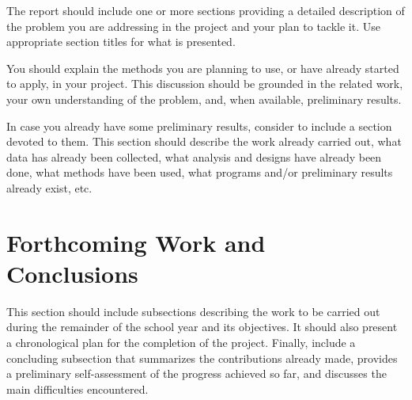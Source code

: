 \documentclass[sigplan]{acmart}
\begin{document}
\begin{template}
  The report should include one or more sections providing a detailed description of the problem you are addressing in the project and your plan to tackle it. Use appropriate section titles for what is presented. 
  
  You should explain the methods you are planning to use, or have already started to apply, in your project. 
  This discussion should be grounded in the related work, your own understanding of the problem, and, when available, preliminary results.
  
  In case you already have some preliminary results, consider to include a section devoted to them. This section should  describe the work already carried out, what data has already been collected, what analysis and designs have already been done, what methods have been used, what programs and/or preliminary results already exist, etc.
\end{template}

\section{Forthcoming Work and Conclusions} \label{sec:conclusions}

\begin{template}
  This section should include subsections describing the work to be carried out during the remainder of the school year and its objectives. 
  It should also present a chronological plan for the completion of the project. 
  Finally, include a concluding subsection that summarizes the contributions already made, provides a preliminary self-assessment of the progress achieved so far, and discusses the main difficulties encountered.
\end{template}





\end{document}
